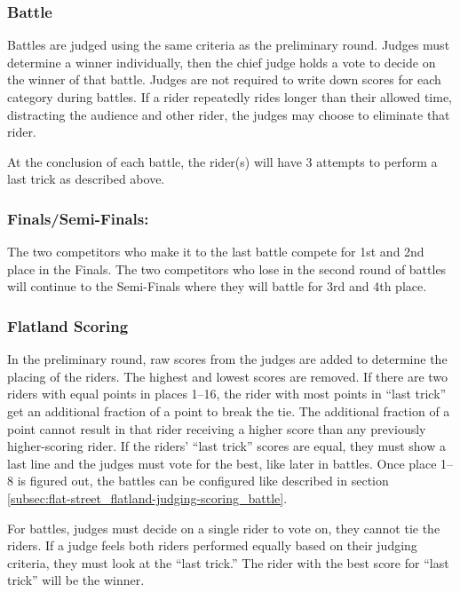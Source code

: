 \subsubsection{Battle \label{subsec:flat-street_flatland-judging-scoring_battle}}
Battles are judged using the same criteria as the preliminary round.
Judges must determine a winner individually, then the chief judge holds a vote to decide on the winner of that battle.
Judges are not required to write down scores for each category during battles.
If a rider repeatedly rides longer than their allowed time, distracting the audience and other rider, the judges may choose to eliminate that rider.

At the conclusion of each battle, the rider(s) will have 3 attempts to perform a last trick as described above.

\subsubsection{Finals/Semi-Finals:}
The two competitors who make it to the last battle compete for 1st and 2nd place in the Finals.
The two competitors who lose in the second round of battles will continue to the Semi-Finals where they will battle for 3rd and 4th place.

\subsubsection{Flatland Scoring}
In the preliminary round, raw scores from the judges are added to determine the placing of the riders.
The highest and lowest scores are removed.
If there are two riders with equal points in places 1–16, the rider with most points in ``last trick'' get an additional fraction of a point to break the tie.
The additional fraction of a point cannot result in that rider receiving a higher score than any previously higher-scoring rider.
If the riders' ``last trick'' scores are equal, they must show a last line and the judges must vote for the best, like later in battles.
Once place 1–8 is figured out, the battles can be configured like described in section \ref{subsec:flat-street_flatland-judging-scoring_battle}.

For battles, judges must decide on a single rider to vote on, they cannot tie the riders.
If a judge feels both riders performed equally based on their judging criteria, they must look at the ``last trick.''
The rider with the best score for ``last trick'' will be the winner.
